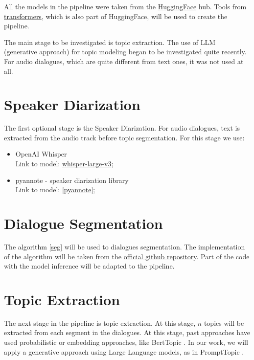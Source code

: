 \documentclass[PMI,VKR]{HSEUniversity}
\begin{document}
All the models in the pipeline were taken from the \href{https://huggingface.co/}{HuggingFace} hub. 
Tools from \href{https://huggingface.co/docs/transformers/index}{transformers}, which is also part of HuggingFace, 
will be used to create the pipeline.

The main stage to be investigated is topic extraction. 
The use of LLM (generative approach) for topic modeling began to be investigated quite recently. 
For audio dialogues, which are quite different from text ones, it was not used at all.

\section{Speaker Diarization}

The first optional stage is the Speaker Diarization. 
For audio dialogues, text is extracted from the audio track before topic segmentation. 
For this stage we use:
\begin{itemize}
    \item OpenAI Whisper \\
    Link to model: \href{https://huggingface.co/openai/whisper-large-v3}{whisper-large-v3};
    \item pyannote - speaker diarization library \cite{pyannote:2023} \\
    Link to model: \href{https://github.com/pyannote/pyannote-audio}{[pyannote]};
\end{itemize} 

\section{Dialogue Segmentation}

The algorithm \ref{seg} will be used to dialogues segmentation. 
The implementation of the algorithm will be taken from the \href{https://github.com/lxing532/Dialogue-Topic-Segmenter}{official github repository}. 
Part of the code with the model inference will be adapted to the pipeline.

\section{Topic Extraction}

The next stage in the pipeline is topic extraction. At this stage, $n$ topics will be extracted from each segment in the dialogues. 
At this stage, past approaches have used probabilistic or embedding approaches, like BertTopic \cite{berttopic:2022}. 
In our work, we will apply a generative approach using Large Language models, as in PromptTopic \cite{prompttopic:2023}.
\end{document}
